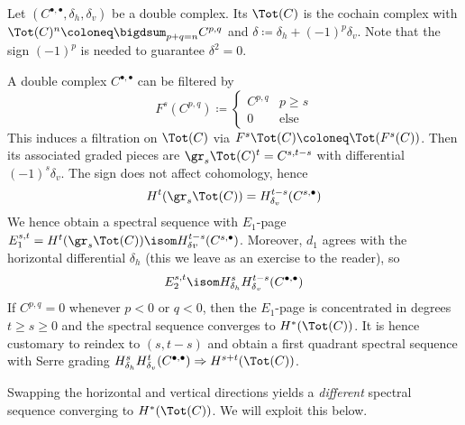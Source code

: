 \begin{definition}
	Let $(C^{\bullet, \bullet}, \delta_h, \delta_v)$ be a double complex.
	Its  $\Tot(C)$ is the cochain complex with $\Tot(C)^n \coloneq \bigdsum_{p + q = n} C^{p, q}$ and $\delta \coloneq \delta_h + (-1)^p \delta_v$.
	Note that the sign $(-1)^p$ is needed to guarantee $\delta^2 = 0$.
\end{definition}
A double complex $C^{\bullet, \bullet}$ can be filtered by 
\begin{equation*}
	F^s(C^{p, q}) \coloneq \begin{cases}
		C^{p, q} 	& p \geq s \\
		0 			& \text{else}
	\end{cases}
\end{equation*}
This induces a filtration on $\Tot(C)$ via $F^s \Tot(C) \coloneq \Tot(F^s(C))$.
Then its associated graded pieces are $\gr_s \Tot(C)^t = C^{s, t - s}$ with differential $(-1)^s \delta_v$.
The sign does not affect cohomology, hence
\begin{equation*}
	H^t(\gr_s \Tot(C)) = H^{t - s}_{\delta_v}(C^{s, \bullet})
\end{equation*}
We hence obtain a spectral sequence with $E_1$-page $E_1^{s, t} = H^t(\gr_s \Tot(C)) \isom H_{\delta v}^{t - s}(C^{s, \bullet})$.
Moreover, $d_1$ agrees with the horizontal differential $\delta_h$ (this we leave as an exercise to the reader), so
\begin{equation*}
	E_2^{s, t} \isom H_{\delta_h}^s H_{\delta_v}^{t - s}(C^{\bullet, \bullet})
\end{equation*}
If $C^{p, q} = 0$ whenever $p < 0$ or $q < 0$, then the $E_1$-page is concentrated in degrees $t \geq s \geq 0$ and the spectral sequence converges to $H^*(\Tot(C))$.
It is hence customary to reindex to $(s, t - s)$ and obtain a first quadrant spectral sequence with Serre grading $H_{\delta_h}^s H_{\delta_v}^t(C^{\bullet, \bullet}) \Rightarrow H^{s + t}(\Tot(C))$.
\begin{remark}
	Swapping the horizontal and vertical directions yields a \emph{different} spectral sequence converging to $H^*(\Tot(C))$.
	We will exploit this below.
\end{remark}

